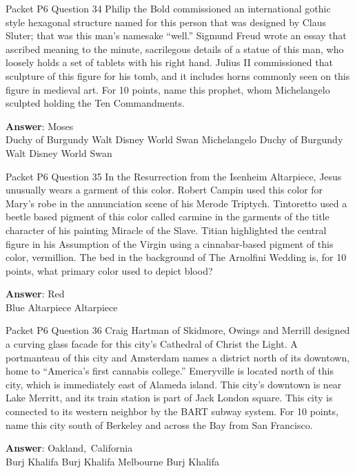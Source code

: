 \begin{frame}{Packet P6 Question 34}
Philip the Bold commissioned   an international gothic style hexagonal structure named for this person that   was designed by Claus Sluter; that was   this man's namesake ``well.'' Sigmund Freud wrote an essay that ascribed meaning to the minute, sacrilegous details of a statue of this man, who loosely holds a set of tablets with his right hand. Julius II commissioned that sculpture of this figure for his tomb, and it includes horns commonly seen on this figure in medieval art. For 10 points, name this prophet, whom Michelangelo sculpted holding the Ten Commandments.      

\textbf{Answer}: Moses\\
 Duchy of Burgundy
 Walt Disney World Swan
 Michelangelo
 Duchy of Burgundy
 Walt Disney World Swan
\end{frame}

\begin{frame}{Packet P6 Question 35}
In the Resurrection from the Isenheim Altarpiece, Jesus unusually wears a garment of this color. Robert     Campin used this color   for Mary’s robe   in the annunciation   scene of his Merode Triptych. Tintoretto used a beetle based pigment of this color called carmine in the garments of the title character of his painting Miracle of the Slave. Titian highlighted the central figure in his Assumption of the Virgin using a cinnabar-based pigment of this color, vermillion. The bed in the background of The Arnolfini Wedding is, for 10 points, what primary color used to depict blood?  

\textbf{Answer}: Red\\
 Blue
 Altarpiece
 Altarpiece
\end{frame}

\begin{frame}{Packet P6 Question 36}
Craig Hartman of Skidmore, Owings and Merrill     designed a curving glass facade for this city’s Cathedral of Christ the Light. A portmanteau of this city and Amsterdam names a district north of its downtown, home to “America’s first cannabis college.” Emeryville is located north of this city, which is immediately east of Alameda island. This city’s downtown is near Lake Merritt, and   its train station is part of Jack London square. This city is connected to its western neighbor by the BART subway system. For 10 points, name this city south of Berkeley and across the Bay from San Francisco.      

\textbf{Answer}: Oakland,\ California\\
 Burj Khalifa
 Burj Khalifa
 Melbourne
 Burj Khalifa
\end{frame}

